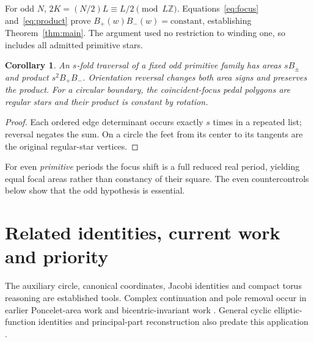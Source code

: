 \documentclass[11pt]{article}
\newtheorem{corollary}[theorem]{Corollary}
\begin{document}
For odd $N$, $2K=(N/2)L\equiv L/2\pmod{L\mathbb Z}$.
Equations~\eqref{eq:focus} and~\eqref{eq:product} prove
$B_+(w)B_-(w)=\mathrm{constant}$, establishing Theorem~\ref{thm:main}.
The argument used no restriction to winding one, so includes all
admitted primitive stars.

\begin{corollary}
An $s$-fold traversal of a fixed odd primitive family has areas $sB_\pm$
and product $s^2B_+B_-$. Orientation reversal changes both area signs
and preserves the product. For a circular boundary, the coincident-focus
pedal polygons are regular stars and their product is constant by rotation.
\end{corollary}
\begin{proof}
Each ordered edge determinant occurs exactly $s$ times in a repeated
list; reversal negates the sum. On a circle the feet from its center to
its tangents are the original regular-star vertices.
\end{proof}
For even \emph{primitive} periods the focus shift is a full reduced real
period, yielding equal focal areas rather than constancy of their square.
The even countercontrols below show that the odd hypothesis is essential.

\section{Related identities, current work and priority}
The auxiliary circle, canonical coordinates, Jacobi identities and compact
torus reasoning are established tools. Complex continuation and pole
removal occur in earlier Poncelet-area work
\cite{AST,Chavez} and bicentric-invariant work \cite{RGR}.
General cyclic elliptic-function identities and principal-part
reconstruction also predate this application \cite{KLS}.
\end{document}
